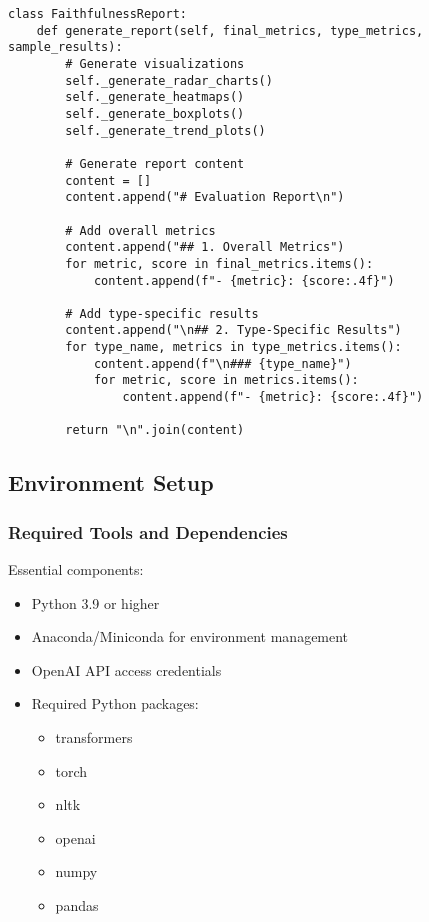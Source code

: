 \begin{lstlisting}[basicstyle=\ttfamily\small,breaklines=true,columns=flexible]
class FaithfulnessReport:
    def generate_report(self, final_metrics, type_metrics, sample_results):
        # Generate visualizations
        self._generate_radar_charts()
        self._generate_heatmaps()
        self._generate_boxplots()
        self._generate_trend_plots()
        
        # Generate report content
        content = []
        content.append("# Evaluation Report\n")
        
        # Add overall metrics
        content.append("## 1. Overall Metrics")
        for metric, score in final_metrics.items():
            content.append(f"- {metric}: {score:.4f}")
        
        # Add type-specific results
        content.append("\n## 2. Type-Specific Results")
        for type_name, metrics in type_metrics.items():
            content.append(f"\n### {type_name}")
            for metric, score in metrics.items():
                content.append(f"- {metric}: {score:.4f}")
        
        return "\n".join(content)
\end{lstlisting}

\subsection{Environment Setup}

\subsubsection{Required Tools and Dependencies}
Essential components:
\begin{itemize}
    \item Python 3.9 or higher
    \item Anaconda/Miniconda for environment management
    \item OpenAI API access credentials
    \item Required Python packages:
    \begin{itemize}
        \item transformers
        \item torch
        \item nltk
        \item openai
        \item numpy
        \item pandas
    \end{itemize}
\end{itemize}

